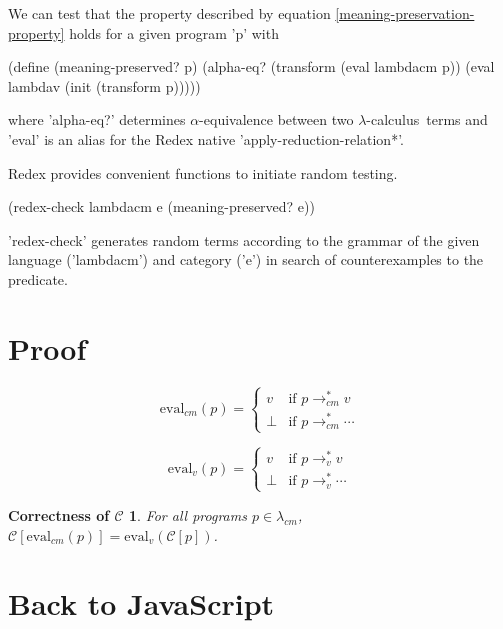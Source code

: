 \documentclass{llncs}
\newcommand{\lc}[0]{$\lambda$-calculus}
\newcommand{\lvrrs}[0]{\rightarrow_v^{*}}
\newcommand{\cmrrs}[0]{\rightarrow_{cm}^{*}}
\newcommand{\C}[1]{\mathcal{C}[#1]}
\begin{document}

We can test that the property described by equation \ref{meaning-preservation-property} holds for a given program \scheme'p' with 
\begin{schemedisplay}
(define (meaning-preserved? p)
  (alpha-eq? (transform (eval lambdacm p)) (eval lambdav (init (transform p)))))
\end{schemedisplay}
where \scheme'alpha-eq?' determines $\alpha$-equivalence between two \lc\ terms and \scheme'eval' is an alias for the Redex native \scheme'apply-reduction-relation*'.

Redex provides convenient functions to initiate random testing.

\begin{schemedisplay}
(redex-check lambdacm e (meaning-preserved? e))
\end{schemedisplay}

\scheme'redex-check' generates random terms according to the grammar of the given language (\scheme'lambdacm') and category (\scheme'e') in search of counterexamples to the predicate. 

\section{Proof}

\begin{definition}
\[
\mathrm{eval}_{cm}(p)=\begin{cases}
v     &\text{if $p\cmrrs v$}\\
\perp &\text{if $p\cmrrs\cdots$}
\end{cases}
\]
\end{definition}

\begin{definition}
\[
\mathrm{eval}_{v}(p)=\begin{cases}
v     &\text{if $p\lvrrs v$}\\
\perp &\text{if $p\lvrrs\cdots$}
\end{cases}
\]
\end{definition}

\newtheorem{maintheorem}{Correctness of $\mathcal{C}$}
\begin{maintheorem}
For all programs $p\in\lambda_{cm}$, $\C{\mathrm{eval}_{cm}(p)}=\mathrm{eval}_{v}(\C{p})$.
\end{maintheorem}

\section{Back to JavaScript}
\end{document}
